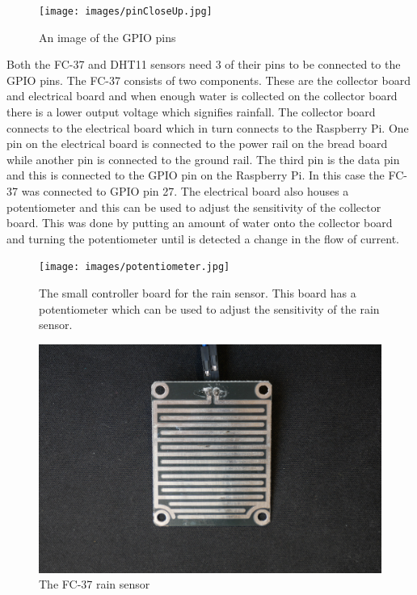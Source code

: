 \documentclass[10pt,a4paper]{article}
\begin{document}
\begin{figure}[H]
  \centering
    \texttt{[image: images/pinCloseUp.jpg]}
    \caption{An image of the GPIO pins}
    \label{fig:pinCloseUp}
\end{figure}

Both the FC-37 and DHT11 sensors need 3 of their pins to be connected to the GPIO pins. The FC-37 consists of two components. These are the collector board and electrical board and when enough water is collected on the collector board there is a lower output voltage which signifies rainfall. The collector board connects to the electrical board which in turn connects to the Raspberry Pi. One pin on the electrical board is connected to the power rail on the bread board while another pin is connected to the ground rail. The third pin is the data pin and this is connected to the GPIO pin on the Raspberry Pi. In this case the FC-37 was connected to GPIO pin 27. The electrical board also houses a potentiometer and this can be used to adjust the sensitivity of the collector board. This was done by putting an amount of water onto the collector board and turning the potentiometer until is detected a change in the flow of current.

\begin{figure}[H]
  \centering
    \texttt{[image: images/potentiometer.jpg]}
    \caption{The small controller board for the rain sensor. This board has a potentiometer which can be used to adjust the sensitivity of the rain sensor.}
    \label{fig:potentiometer}
\end{figure}

\begin{figure}[H]
  \centering
    \includegraphics[width=\linewidth]{images/rainPanel.jpg}
    \caption{The FC-37 rain sensor}
    \label{fig:rain panel}
\end{figure}
\end{document}
